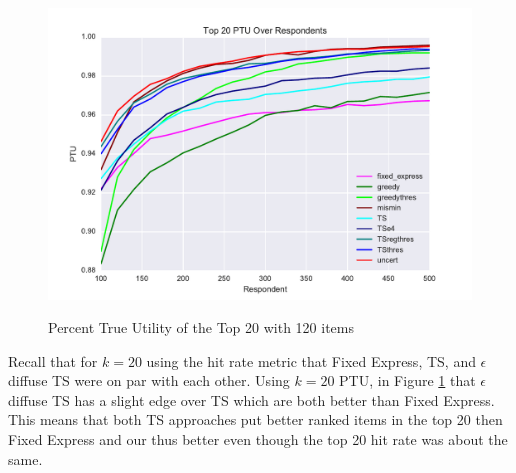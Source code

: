 \documentclass[nonblindrev]{informs3}
\begin{document}
\begin{figure}
\caption{Percent True Utility of the Top 20 with 120 items}
\includegraphics[width=1\textwidth]{plots/PTU120v20k20.pdf}
\label{fig:20util}
\end{figure}
Recall that for $k=20$ using the hit rate metric that Fixed Express, TS, and $\epsilon$ diffuse TS were on par with each other.
Using $k=20$ PTU, in Figure \ref{fig:20util} that $\epsilon$ diffuse TS has a slight edge over TS which are both better than Fixed Express. This means that both TS approaches put better ranked items in the top 20 then Fixed Express and our thus better even though the top 20 hit rate was about the same.
\end{document}
